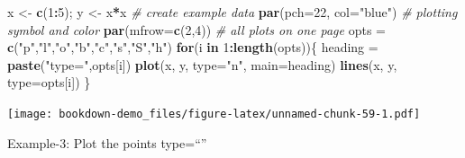\documentclass[]{book}
\newenvironment{Shaded}{\begin{snugshade}}{\end{snugshade}}
\newcommand{\KeywordTok}[1]{\textcolor[rgb]{0.13,0.29,0.53}{\textbf{#1}}}
\newcommand{\DataTypeTok}[1]{\textcolor[rgb]{0.13,0.29,0.53}{#1}}
\newcommand{\DecValTok}[1]{\textcolor[rgb]{0.00,0.00,0.81}{#1}}
\newcommand{\StringTok}[1]{\textcolor[rgb]{0.31,0.60,0.02}{#1}}
\newcommand{\CommentTok}[1]{\textcolor[rgb]{0.56,0.35,0.01}{\textit{#1}}}
\newcommand{\ControlFlowTok}[1]{\textcolor[rgb]{0.13,0.29,0.53}{\textbf{#1}}}
\newcommand{\OperatorTok}[1]{\textcolor[rgb]{0.81,0.36,0.00}{\textbf{#1}}}
\newcommand{\NormalTok}[1]{#1}
\begin{document}
\begin{Shaded}
\begin{Highlighting}[]
\NormalTok{x <-}\StringTok{ }\KeywordTok{c}\NormalTok{(}\DecValTok{1}\OperatorTok{:}\DecValTok{5}\NormalTok{); y <-}\StringTok{ }\NormalTok{x}\OperatorTok{*}\NormalTok{x }\CommentTok{# create example data }
\KeywordTok{par}\NormalTok{(}\DataTypeTok{pch=}\DecValTok{22}\NormalTok{, }\DataTypeTok{col=}\StringTok{"blue"}\NormalTok{) }\CommentTok{# plotting symbol and color }
\KeywordTok{par}\NormalTok{(}\DataTypeTok{mfrow=}\KeywordTok{c}\NormalTok{(}\DecValTok{2}\NormalTok{,}\DecValTok{4}\NormalTok{)) }\CommentTok{# all plots on one page }
\NormalTok{opts =}\StringTok{ }\KeywordTok{c}\NormalTok{(}\StringTok{"p"}\NormalTok{,}\StringTok{"l"}\NormalTok{,}\StringTok{"o"}\NormalTok{,}\StringTok{"b"}\NormalTok{,}\StringTok{"c"}\NormalTok{,}\StringTok{"s"}\NormalTok{,}\StringTok{"S"}\NormalTok{,}\StringTok{"h"}\NormalTok{) }
\ControlFlowTok{for}\NormalTok{(i }\ControlFlowTok{in} \DecValTok{1}\OperatorTok{:}\KeywordTok{length}\NormalTok{(opts))\{ }
\NormalTok{  heading =}\StringTok{ }\KeywordTok{paste}\NormalTok{(}\StringTok{"type="}\NormalTok{,opts[i]) }
  \KeywordTok{plot}\NormalTok{(x, y, }\DataTypeTok{type=}\StringTok{"n"}\NormalTok{, }\DataTypeTok{main=}\NormalTok{heading) }
  \KeywordTok{lines}\NormalTok{(x, y, }\DataTypeTok{type=}\NormalTok{opts[i]) }
\NormalTok{\}}
\end{Highlighting}
\end{Shaded}

\texttt{[image: bookdown-demo\_files/figure-latex/unnamed-chunk-59-1.pdf]}

Example-3: Plot the points type=``''

\begin{Shaded}
\end{Shaded}
\end{document}
